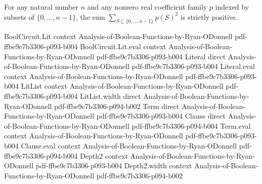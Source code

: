 \begin{lemma}
\leanok
{}
For any natural number $n$ and any nonzero real coefficient family $p$ indexed by
subsets of $\{0,\ldots,n-1\}$, the sum $\sum_{S\subseteq\{0,\ldots,n-1\}}p(S)^2$ is
strictly positive.
\end{lemma}

\begin{lemma}
\leanok
{}
\proofstep
  {BoolCircuit.Lit}
  {context}
  {Analysis-of-Boolean-Functions-by-Ryan-ODonnell}
  {pdf-ffbe9c7b3306-p093-b004}
\proofstep
  {BoolCircuit.Lit.eval}
  {context}
  {Analysis-of-Boolean-Functions-by-Ryan-ODonnell}
  {pdf-ffbe9c7b3306-p093-b004}
\proofstep
  {Literal}
  {direct}
  {Analysis-of-Boolean-Functions-by-Ryan-ODonnell}
  {pdf-ffbe9c7b3306-p093-b004}
\proofstep
  {Literal.eval}
  {context}
  {Analysis-of-Boolean-Functions-by-Ryan-ODonnell}
  {pdf-ffbe9c7b3306-p093-b004}
\proofstep
  {LitList}
  {context}
  {Analysis-of-Boolean-Functions-by-Ryan-ODonnell}
  {pdf-ffbe9c7b3306-p093-b004}
\proofstep
  {LitList.width}
  {direct}
  {Analysis-of-Boolean-Functions-by-Ryan-ODonnell}
  {pdf-ffbe9c7b3306-p094-b002}
\proofstep
  {Term}
  {direct}
  {Analysis-of-Boolean-Functions-by-Ryan-ODonnell}
  {pdf-ffbe9c7b3306-p093-b004}
\proofstep
  {Clause}
  {direct}
  {Analysis-of-Boolean-Functions-by-Ryan-ODonnell}
  {pdf-ffbe9c7b3306-p094-b004}
\proofstep
  {Term.eval}
  {context}
  {Analysis-of-Boolean-Functions-by-Ryan-ODonnell}
  {pdf-ffbe9c7b3306-p093-b004}
\proofstep
  {Clause.eval}
  {context}
  {Analysis-of-Boolean-Functions-by-Ryan-ODonnell}
  {pdf-ffbe9c7b3306-p094-b004}
\proofstep
  {Depth2}
  {context}
  {Analysis-of-Boolean-Functions-by-Ryan-ODonnell}
  {pdf-ffbe9c7b3306-p093-b004}
\proofstep
  {Depth2.width}
  {context}
  {Analysis-of-Boolean-Functions-by-Ryan-ODonnell}
  {pdf-ffbe9c7b3306-p094-b002}

\end{lemma}

